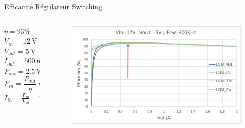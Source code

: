 \begin{frame}{Efficacité Régulateur Switching}
    \begin{columns}
        \begin{column}{0.45\textwidth}
            \centering
             {
                $\eta = 93\%$\\
                \vspace{12pt}
                $V_{in}  = \SI{12}{\volt}$\\
                $V_{out} = \SI{5}{\volt}$\\
                $I_{out} = \SI{500}{\milli\ampere}$\\
                $P_{out} = \SI{2.5}{\watt}$\\
            }
             {
                \vspace{18pt}
                $P_{in} = \dfrac{P_{out}}{\eta} = \dfrac{\SI{2.5}{\watt}}{93\%} = \SI{2.688}{\watt}$\\
                \vspace{6pt}
                $I_{in} = \frac{P_{in}}{V_{in}} = \SI{224}{\milli\ampere}$\\
            }
        \end{column}
        \begin{column}{0.55\textwidth}
            \begin{figure}
                \includegraphics[width=\textwidth, height=0.75\textheight, keepaspectratio]{pictures/l6982-efficiency-curve.png}
            \end{figure}
        \end{column}
    \end{columns}
\end{frame}

